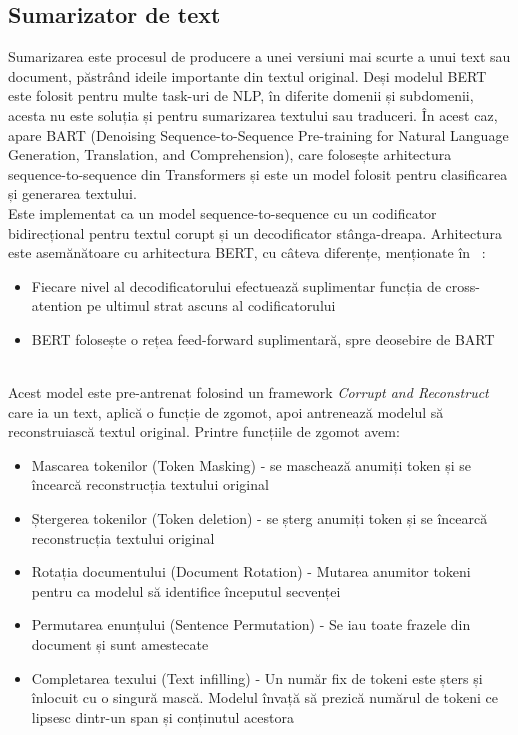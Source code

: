 \subsection{Sumarizator de text}
Sumarizarea este procesul de producere a unei versiuni mai scurte a unui text sau document, păstrând ideile importante din textul original.
Deși modelul BERT este folosit pentru multe task-uri de NLP, în diferite domenii și subdomenii, acesta nu este soluția și pentru sumarizarea textului sau traduceri. În acest caz, apare BART (Denoising Sequence-to-Sequence Pre-training for Natural
Language Generation, Translation, and Comprehension), care folosește arhitectura sequence-to-sequence din Transformers și este un model folosit pentru clasificarea și generarea textului.\\
Este implementat ca un model sequence-to-sequence cu un codificator bidirecțional pentru textul corupt și un decodificator stânga-dreapa.
Arhitectura este asemănătoare cu arhitectura BERT, cu câteva diferențe, menționate în ~\cite{BARTArchitecture}: 
\begin{itemize}
    \setlength\itemsep{0.5em}
    \item Fiecare nivel al decodificatorului efectuează suplimentar funcția de cross-atention pe ultimul strat ascuns al codificatorului
    \item BERT folosește o rețea feed-forward suplimentară, spre deosebire de BART
\end{itemize}
\ \\
Acest model este pre-antrenat folosind un framework {\it Corrupt and Reconstruct}~\cite{CorruptAndReconstruct} care ia un text, aplică o funcție de zgomot, apoi antrenează modelul să reconstruiască textul original. 
Printre funcțiile de zgomot avem: 
\begin{itemize}
    \setlength\itemsep{0.5em}
    \item Mascarea tokenilor (Token Masking) - se maschează anumiți token și se încearcă reconstrucția textului original
    \item Ștergerea tokenilor (Token deletion) - se șterg anumiți token și se încearcă reconstrucția textului original
    \item Rotația documentului (Document Rotation) - Mutarea anumitor tokeni pentru ca modelul să identifice începutul secvenței
    \item Permutarea enunțului (Sentence Permutation) - Se iau toate frazele din document și sunt amestecate
    \item Completarea texului (Text infilling) - Un număr fix de tokeni este șters și înlocuit cu o singură mască. Modelul învață să prezică numărul de tokeni ce lipsesc dintr-un span și conținutul acestora~\cite{SpanBERT}
\end{itemize}
